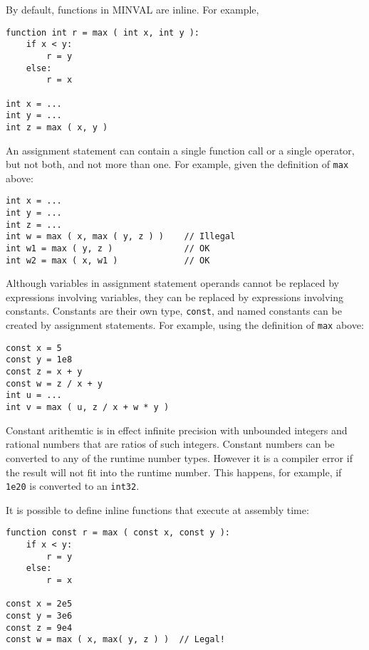 \documentclass[12pt]{article}
\newenvironment{indpar}[1][0.3in]%
	{\begin{list}{}%
		     {\setlength{\itemsep}{0in}%
		      \setlength{\topsep}{0in}%
		      \setlength{\parsep}{1ex}%
		      \setlength{\labelwidth}{#1}%
		      \setlength{\leftmargin}{#1}%
		      \addtolength{\leftmargin}{\labelsep}}%
	 \item}%
	{\end{list}}
\begin{document}
By default, functions in MINVAL are inline.  For example,

\begin{indpar}\begin{verbatim}
function int r = max ( int x, int y ):
    if x < y:
        r = y
    else:
        r = x

int x = ...
int y = ...
int z = max ( x, y )
\end{verbatim}\end{indpar}

An assignment statement can contain a single function call
or a single operator, but not both, and not more than one.
For example, given the definition of {\tt max} above:

\begin{indpar}\begin{verbatim}
int x = ...
int y = ...
int z = ...
int w = max ( x, max ( y, z ) )    // Illegal
int w1 = max ( y, z )              // OK
int w2 = max ( x, w1 )             // OK
\end{verbatim}\end{indpar}

Although variables in assignment statement operands cannot be
replaced by expressions involving variables, they can be replaced
by expressions involving constants.  Constants are their own
type, {\tt const}, and named constants can be created by assignment
statements.  For example, using the definition of {\tt max} above:

\begin{indpar}\begin{verbatim}
const x = 5
const y = 1e8
const z = x + y
const w = z / x + y
int u = ...
int v = max ( u, z / x + w * y )
\end{verbatim}\end{indpar}

Constant arithemtic is in effect infinite precision with unbounded
integers and rational numbers that are ratios of such integers.
Constant numbers can be converted to any of the runtime
number types.  However it is a compiler error
if the result will not fit into the runtime number.
This happens, for example, if {\tt 1e20}
is converted to an {\tt int32}.

It is possible to define inline functions that execute at assembly
time:

\begin{indpar}\begin{verbatim}
function const r = max ( const x, const y ):
    if x < y:
        r = y
    else:
        r = x

const x = 2e5
const y = 3e6
const z = 9e4
const w = max ( x, max( y, z ) )  // Legal!
\end{verbatim}\end{indpar}
\end{document}
